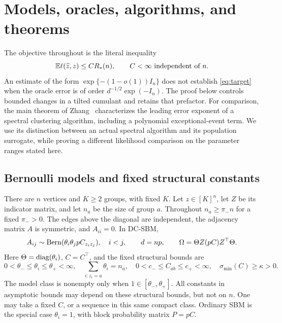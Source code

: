 \section{Models, oracles, algorithms, and theorems}\label{sec:statements}

The objective throughout is the literal inequality
\begin{equation}\label{eq:target}
 \mathbb E\ell(\widehat z,z)\le C R_*(n),\qquad C<\infty\text{ independent of }n.
\end{equation}
An estimate of the form $\exp\{-(1-o(1))I_n\}$ does not establish
\eqref{eq:target} when the oracle error is of order
$d^{-1/2}\exp(-I_n)$. The proof below controls bounded changes in a
tilted cumulant and retains that prefactor. For comparison, the main theorem
of Zhang~\cite{zhang} characterizes the leading error exponent of a spectral
clustering algorithm, including a polynomial exceptional-event term. We use
its distinction between an actual spectral algorithm and its population
surrogate, while proving a different likelihood comparison on the parameter
ranges stated here.

\subsection{Bernoulli models and fixed structural constants}

There are $n$ vertices and $K\ge2$ groups, with fixed $K$.
Let $z\in[K]^n$, let $Z$ be its indicator matrix, and let $n_a$ be the size
of group $a$. Throughout $n_a\ge\pi_-n$ for a fixed $\pi_->0$.
The edges above the diagonal are independent, the adjacency matrix $A$ is
symmetric, and $A_{ii}=0$. In DC-SBM,
\begin{equation}\label{eq:mean-model}
 A_{ij}\sim\operatorname{Bern}(\theta_i\theta_j p C_{z_i z_j}),\quad i<j,
 \qquad d=np,\qquad
 \Omega=\Theta Z(pC)Z^\top\Theta.
\end{equation}
Here $\Theta=\operatorname{diag}(\theta_i)$, $C=C^\top$, and the fixed structural bounds are
\begin{equation}\label{eq:structural}
 0<\theta_-\le\theta_i\le\theta_+<\infty,\quad
 \sum_{i:z_i=a}\theta_i=n_a,\quad
 0<c_-\le C_{ab}\le c_+<\infty,\quad
 \sigma_{\min}(C)\ge\kappa>0.
\end{equation}
The model class is nonempty only when $1\in[\theta_-,\theta_+]$.
All constants in asymptotic bounds may depend on these structural bounds,
but not on $n$. One may take a fixed $C$, or a sequence in this same compact
class. Ordinary SBM is the special case $\theta_i=1$, with block probability
matrix $P=pC$.

